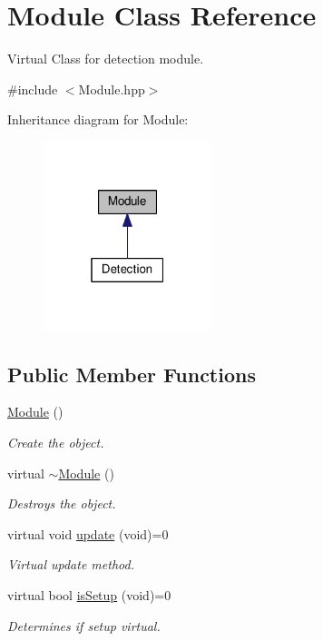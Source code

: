 \hypertarget{class_module}{}\section{Module Class Reference}
\label{class_module}


Virtual Class for detection module.  




{\ttfamily \#include $<$Module.\+hpp$>$}



Inheritance diagram for Module\+:
\nopagebreak
\begin{figure}[H]
\begin{center}
\leavevmode
\includegraphics[width=139pt]{class_module__inherit__graph}
\end{center}
\end{figure}
\subsection*{Public Member Functions}
\begin{DoxyCompactItemize}
\item 
\hyperlink{class_module_a5a240a8a9ab1813b17bcb810b24ceaea}{Module} ()
\begin{DoxyCompactList}\small\item\em Create the object. \end{DoxyCompactList}\item 
virtual \hyperlink{class_module_a57f2a54e7dacfb7a67355f1412c07130}{$\sim$\+Module} ()
\begin{DoxyCompactList}\small\item\em Destroys the object. \end{DoxyCompactList}\item 
virtual void \hyperlink{class_module_a21af40d45926cf90d6573f5ac5a1149f}{update} (void)=0
\begin{DoxyCompactList}\small\item\em Virtual update method. \end{DoxyCompactList}\item 
virtual bool \hyperlink{class_module_a20fb30b0bf6ea415e93efbbacc68043c}{is\+Setup} (void)=0
\begin{DoxyCompactList}\small\item\em Determines if setup virtual. \end{DoxyCompactList}\end{DoxyCompactItemize}


